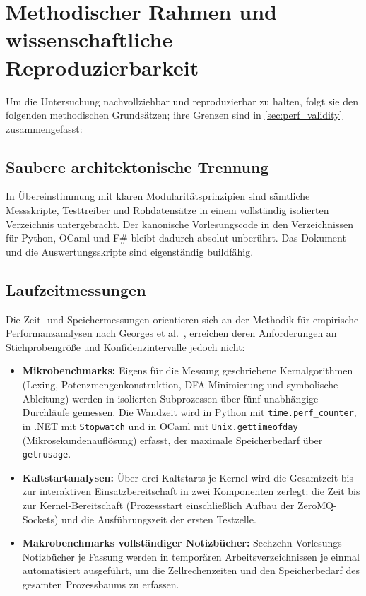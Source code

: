 \section{Methodischer Rahmen und wissenschaftliche Reproduzierbarkeit}
\label{sec:intro_methodology}

Um die Untersuchung nachvollziehbar und reproduzierbar zu halten, folgt sie den folgenden methodischen Grundsätzen; ihre Grenzen sind in \cref{sec:perf_validity} zusammengefasst:

\subsection{Saubere architektonische Trennung}
In Übereinstimmung mit klaren Modularitätsprinzipien sind sämtliche Messskripte, Testtreiber und Rohdatensätze in einem vollständig isolierten Verzeichnis untergebracht.
Der kanonische Vorlesungscode in den Verzeichnissen für Python, OCaml und F\# bleibt dadurch absolut unberührt.
Das Dokument und die Auswertungsskripte sind eigenständig buildfähig.

\subsection{Laufzeitmessungen}
Die Zeit- und Speichermessungen orientieren sich an der Methodik für empirische Performanzanalysen nach Georges et al.~\cite{georges2007statistically}, erreichen deren Anforderungen an Stichprobengröße und Konfidenzintervalle jedoch nicht:
\begin{itemize}
  \item \textbf{Mikrobenchmarks:} Eigens für die Messung geschriebene Kernalgorithmen (Lexing, Potenzmengenkonstruktion, DFA-Minimierung und symbolische Ableitung) werden in isolierten Subprozessen über fünf unabhängige Durchläufe gemessen.
  Die Wandzeit wird in Python mit \texttt{time.perf\_counter}, in .NET mit \texttt{Stopwatch} und in OCaml mit \texttt{Unix.gettimeofday} (Mikrosekundenauflösung) erfasst, der maximale Speicherbedarf über \texttt{getrusage}.
  \item \textbf{Kaltstartanalysen:} Über drei Kaltstarts je Kernel wird die Gesamtzeit bis zur interaktiven Einsatzbereitschaft in zwei Komponenten zerlegt: die Zeit bis zur Kernel-Bereitschaft (Prozessstart einschließlich Aufbau der ZeroMQ-Sockets) und die Ausführungszeit der ersten Testzelle.
  \item \textbf{Makrobenchmarks vollständiger Notizbücher:} Sechzehn Vorlesungs-Notizbücher je Fassung werden in temporären Arbeitsverzeichnissen je einmal automatisiert ausgeführt, um die Zellrechenzeiten und den Speicherbedarf des gesamten Prozessbaums zu erfassen.
\end{itemize}

